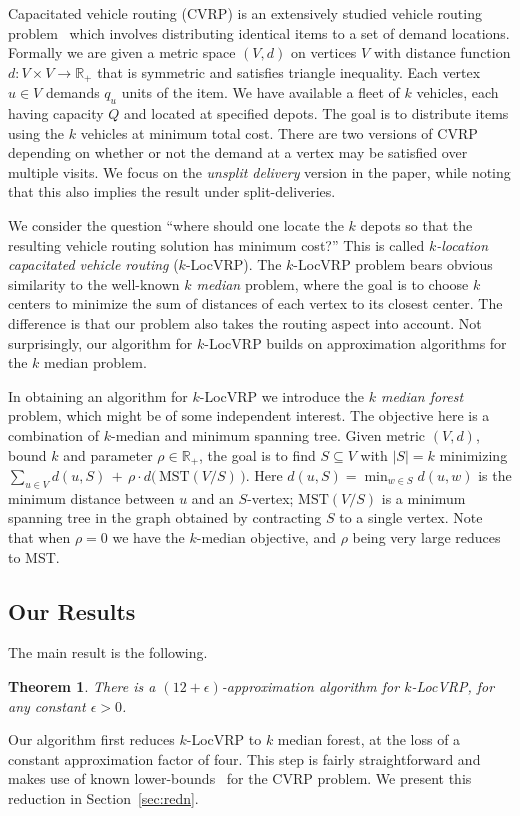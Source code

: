 \documentclass[11pt,twoside,a4paper]{article}
\newtheorem{theorem}{Theorem}
\newcommand{\sse}{\subseteq}
\def\lrp{$k$-LocVRP\xspace}
\begin{document}
Capacitated vehicle routing (CVRP) is an extensively studied vehicle routing problem~\cite{TV02} which involves
distributing identical items to a set of demand locations. Formally we are given a metric space $(V,d)$ on vertices $V$
with distance function $d:V\times V\rightarrow \mathbb{R}_+$ that is symmetric and satisfies triangle inequality. Each
vertex $u\in V$ demands $q_u$ units of the item. We have available a fleet of $k$ vehicles, each having capacity $Q$
and located at specified depots. The goal is to distribute items using the $k$ vehicles at minimum total cost. There
are two versions of CVRP depending on whether or not the demand at a vertex may be satisfied over multiple visits. We
focus on the  {\em unsplit delivery} version in the paper, while noting that this also implies the result under
split-deliveries.


We consider the question ``where should one locate the $k$ depots so that the resulting vehicle routing solution has
minimum cost?'' This is called {\em $k$-location capacitated vehicle routing} (\lrp). The \lrp problem bears obvious
similarity to the well-known {\em $k$ median} problem, where the goal is to choose $k$ centers to minimize the sum of
distances of each vertex to its closest center. The difference is that our problem also takes the routing aspect into
account.  Not surprisingly, our algorithm for \lrp builds on approximation algorithms for the $k$ median problem.

In obtaining an algorithm for \lrp we introduce the {\em  $k$ median forest} problem, which might be of some
independent interest. The objective here is a combination of $k$-median and minimum spanning tree. Given metric
$(V,d)$, bound $k$ and parameter $\rho\in\mathbb{R}_+$, the goal is to find $S\sse V$ with $|S|=k$ minimizing
$\sum_{u\in V} d(u,S) \, + \, \rho\cdot d\big(\,\mbox{MST}(V/S)\,\big)$.  Here $d(u,S)=\min_{w\in S} d(u,w)$ is the
minimum distance between $u$ and an $S$-vertex; $\mbox{MST}(V/S)$ is a minimum spanning tree in the graph obtained by
contracting $S$ to a single vertex. Note that when $\rho=0$ we have the $k$-median objective, and $\rho$ being very
large reduces to MST.
\subsection{Our Results}
The main result is the following.
\begin{theorem}\label{th:lcvrp}
There is a $(12+\epsilon)$-approximation algorithm for \lrp, for any constant $\epsilon>0$.
\end{theorem}
Our algorithm first reduces \lrp to $k$ median forest, at the loss of a constant approximation factor of four. This
step is fairly straightforward and makes use of
known lower-bounds~\cite{HK85} for the CVRP problem. We present this reduction in Section~\ref{sec:redn}.
\end{document}

